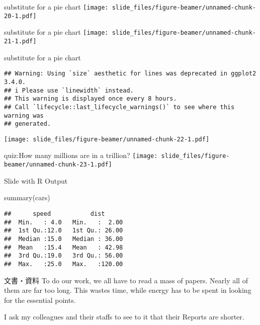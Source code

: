 \documentclass[
  ignorenonframetext,
]{beamer}
\newenvironment{Shaded}{\begin{snugshade}}{\end{snugshade}}
\newcommand{\FunctionTok}[1]{\textcolor[rgb]{0.00,0.00,0.00}{#1}}
\newcommand{\NormalTok}[1]{#1}
\let\oldShaded\Shaded
\let\endoldShaded\endShaded
\renewenvironment{Shaded}{\footnotesize\oldShaded}{\endoldShaded}
\begin{document}
\begin{frame}{substitute for a pie chart}
\protect\hypertarget{substitute-for-a-pie-chart}{}
\texttt{[image: slide\_files/figure-beamer/unnamed-chunk-20-1.pdf]}
\end{frame}

\begin{frame}{substitute for a pie chart}
\protect\hypertarget{substitute-for-a-pie-chart-1}{}
\texttt{[image: slide\_files/figure-beamer/unnamed-chunk-21-1.pdf]}
\end{frame}

\begin{frame}[fragile]{substitute for a pie chart}
\protect\hypertarget{substitute-for-a-pie-chart-2}{}
\begin{verbatim}
## Warning: Using `size` aesthetic for lines was deprecated in ggplot2 3.4.0.
## i Please use `linewidth` instead.
## This warning is displayed once every 8 hours.
## Call `lifecycle::last_lifecycle_warnings()` to see where this warning was
## generated.
\end{verbatim}

\texttt{[image: slide\_files/figure-beamer/unnamed-chunk-22-1.pdf]}
\end{frame}

\begin{frame}{quiz:How many millions are in a trillion?}
\protect\hypertarget{quizhow-many-millions-are-in-a-trillion-2}{}
\texttt{[image: slide\_files/figure-beamer/unnamed-chunk-23-1.pdf]}
\end{frame}

\begin{frame}[fragile]{Slide with R Output}
\protect\hypertarget{slide-with-r-output}{}
\begin{Shaded}
\begin{Highlighting}[]
\FunctionTok{summary}\NormalTok{(cars)}
\end{Highlighting}
\end{Shaded}

\begin{verbatim}
##      speed           dist       
##  Min.   : 4.0   Min.   :  2.00  
##  1st Qu.:12.0   1st Qu.: 26.00  
##  Median :15.0   Median : 36.00  
##  Mean   :15.4   Mean   : 42.98  
##  3rd Qu.:19.0   3rd Qu.: 56.00  
##  Max.   :25.0   Max.   :120.00
\end{verbatim}
\end{frame}

\begin{frame}{文書・資料}
\protect\hypertarget{ux6587ux66f8ux8cc7ux6599}{}
To do our work, we all have to read a mass of papers. Nearly all of them
are far too long. This wastes time, while energy has to be spent in
looking for the essential points.

I ask my colleagues and their staffs to see to it that their Reports are
shorter.
\end{frame}
\end{document}
